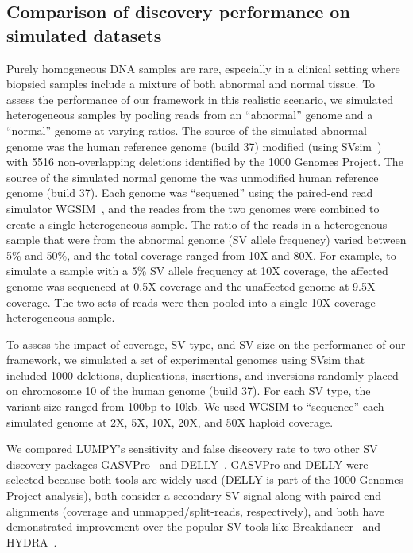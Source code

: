 \documentclass[10pt]{bmc_article}
\newenvironment{bmcformat}{\begin{raggedright}\baselineskip20pt\sloppy\setboolean{publ}{false}}{\end{raggedright}\baselineskip20pt\sloppy}
\begin{document}
\begin{bmcformat}
\subsection*{Comparison of discovery performance on simulated datasets}
Purely homogeneous DNA samples are rare, especially in a clinical setting where
biopsied samples include a mixture of both abnormal and normal tissue.  To
assess the performance of our framework in this realistic scenario, we simulated
heterogeneous samples by pooling reads from an ``abnormal'' genome and a
``normal'' genome at varying ratios.  The source of the simulated abnormal
genome was the human reference genome (build 37) modified (using
SVsim~\cite{faustunpub}) with 5516 non-overlapping deletions identified by the
1000 Genomes Project.  The  source of the simulated normal genome the was
unmodified human reference genome (build 37).  Each genome was ``sequened''
using the paired-end read simulator WGSIM~\cite{liunpub}, and the reades from
the two genomes were combined to create a single heterogeneous sample.  The
ratio of the reads in a heterogenous sample that were from the abnormal genome
(SV allele frequency) varied between 5\% and 50\%, and the total coverage ranged
from 10X and 80X.  For example, to simulate a sample with a 5\% SV allele
frequency at 10X coverage, the affected genome was sequenced at 0.5X coverage
and the unaffected genome at 9.5X coverage.  The two sets of reads were then
pooled into a single 10X coverage heterogeneous sample.

To assess the impact of coverage, SV type, and SV size on the performance of
our framework, we simulated a set of experimental genomes using SVsim that
included 1000 deletions, duplications, insertions, and inversions randomly
placed on chromosome 10 of the human genome (build 37).  For each SV type, 
the variant size ranged from 100bp to 10kb.  We used WGSIM to ``sequence'' each
simulated genome at 2X, 5X, 10X, 20X, and 50X haploid coverage.  


We compared LUMPY’s sensitivity and false discovery rate to two other SV
discovery packages GASVPro~\cite{sindi2012} and DELLY~\cite{rausch2012b}.
GASVPro and DELLY were selected because both tools are widely used (DELLY is
part of the 1000 Genomes Project analysis), both consider a secondary SV signal
along with paired-end alignments (coverage and unmapped/split-reads,
respectively), and both have demonstrated improvement over the popular SV tools
like Breakdancer~\cite{chen2009} and HYDRA~\cite{quinlan2010b}. 



\end{bmcformat}
\end{document}
